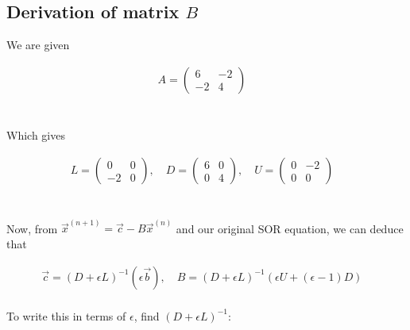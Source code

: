 \documentclass[../main.tex]{subfiles}
\begin{document}
    \subsection*{Derivation of matrix $B$}\label{subsec:derivation-of-matrix}

    We are given
    \begin{center*}
        \begin{align*}
            & A = \begin{pmatrix}
                6 & -2 \\
                -2 & 4
            \end{pmatrix} && \\
        \end{align*}
    \end{center*}\\
    Which gives
    \begin{center*}
        \begin{align*}
            & L = \begin{pmatrix}
                0 & 0 \\
                -2 & 0
            \end{pmatrix},\quad
            D = \begin{pmatrix}
                6 & 0 \\
                0 & 4
            \end{pmatrix},\quad
            U = \begin{pmatrix}
                0 & -2 \\
                0 & 0
            \end{pmatrix} && \\
        \end{align*}
    \end{center*}\\
    Now, from $\vec{x}^{(n+1)} = \vec{c} - B\vec{x}^{(n)}$ and our original SOR equation, we can deduce that
    \begin{center*}
        \begin{align*}
            & \vec{c} = (D + \epsilon L)^{-1}(\epsilon \vec{b}),\quad B = (D + \epsilon L)^{-1}(\epsilon U + (\epsilon - 1)D) && \\
        \end{align*}
    \end{center*}
    To write this in terms of $\epsilon$, find $(D + \epsilon L)^{-1}$:
\end{document}
